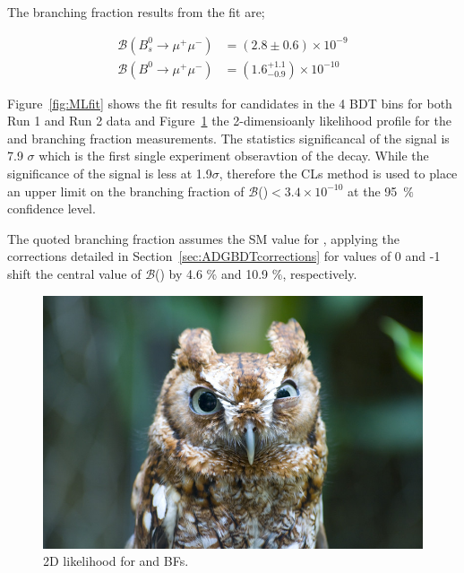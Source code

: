 The branching fraction results from the fit are;

\begin{equation}
\begin{split}
  \mathcal{B}(B^{0}_{s} \to \mu^{+} \mu^{-}) &= (2.8 \pm 0.6) \times 10^{-9} \\
  \mathcal{B}(B^{0} \to \mu^{+} \mu^{-}) &= (1.6^{+1.1}_{-0.9})    \times 10^{-10} 
\end{split}
\label{eq:BFresults}
\end{equation}

Figure~\ref{fig:MLfit} shows the fit results for \bmumu candidates in the 4 BDT bins for both Run 1 and Run 2 data and Figure~\ref{fig:contour} the 2-dimensioanly likelihood profile for the \bdmumu and \bsmumu branching fraction measurements.
The statistics significancal of the \bsmumu signal is 7.9 $\sigma$ which is the first single experiment obseravtion of the \bsmumu decay. While the significance of the \bdmumu signal is less at 1.9$\sigma$, therefore the CLs method is used to place an upper limit on the branching fraction of $\mathcal{B}$(\bdmumu)$ < 3.4 \times 10^{-10}$  at the 95~$\%$ confidence level.

The quoted \bsmumu branching fraction assumes the SM value for \ADG, applying the corrections detailed in Section~\ref{sec:ADGBDTcorrections} for \ADG values of 0 and -1 shift the central value of $\mathcal{B}$(\bsmumu) by 4.6 $\%$ and 10.9 $\%$, respectively. 





\begin{figure}[htbp]
    \centering
        \includegraphics[width= 0.8 \textwidth]{./Figs/BFAnalysis/placeholder.jpeg}
      \caption{2D likelihood for \bd and \bs BFs. }
    \label{fig:contour}
\end{figure}


